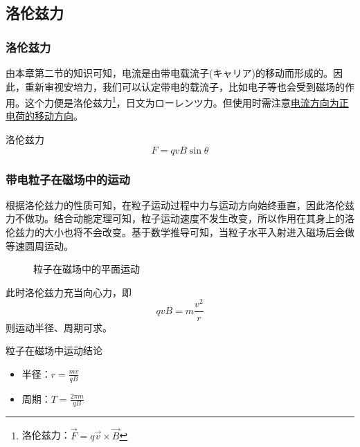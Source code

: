 \subsection{洛伦兹力}
\label{subsec:4.3.3}

\subsubsection{洛伦兹力}

由本章第二节的知识可知，电流是由带电载流子(キャリア)的移动而形成的。因此，重新审视安培力，我们可以认定带电的载流子，比如电子等也会受到磁场的作用。这个力便是洛伦兹力\footnote{洛伦兹力：$\vec{F}=q\vec{v}\times\vec{B}$}，日文为ローレンツ力。但使用时需注意\underline{电流方向为正电荷的移动方向}。
\begin{itembox}[l]{洛伦兹力}
    \begin{equation*}
        F=qvB\sin\theta
    \end{equation*}
\end{itembox}

\subsubsection{带电粒子在磁场中的运动}

根据洛伦兹力的性质可知，在粒子运动过程中力与运动方向始终垂直，因此洛伦兹力不做功。结合动能定理可知，粒子运动速度不发生改变，所以作用在其身上的洛伦兹力的大小也将不会改变。基于数学推导可知，当粒子水平入射进入磁场后会做等速圆周运动。
\begin{figure}[ht!]
    \centering
    \caption{粒子在磁场中的平面运动}
\end{figure}

此时洛伦兹力充当向心力，即
\begin{equation*}
    qvB=m\frac{v^2}{r}
\end{equation*}
则运动半径、周期可求。
\begin{itembox}[l]{粒子在磁场中运动结论}
    \begin{itemize}
        \item 半径：$r=\frac{mv}{qB}$
        \item 周期：$T=\frac{2\pi m}{qB}$
    \end{itemize}
\end{itembox}

